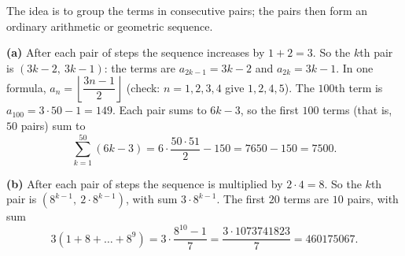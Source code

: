 The idea is to group the terms in consecutive pairs; the pairs then form an ordinary arithmetic or geometric sequence.

\textbf{(a)} After each pair of steps the sequence increases by $1+2=3$. So the $k$th pair is $(3k-2,\ 3k-1)$: the terms are $a_{2k-1}=3k-2$ and $a_{2k}=3k-1$. In one formula, $a_n=\left\lfloor\dfrac{3n-1}{2}\right\rfloor$ (check: $n=1,2,3,4$ give $1,2,4,5$). The $100$th term is $a_{100}=3\cdot50-1=\boxed{149}$. Each pair sums to $6k-3$, so the first $100$ terms (that is, $50$ pairs) sum to
\[
\sum_{k=1}^{50}(6k-3)=6\cdot\dfrac{50\cdot51}{2}-150=7650-150=\boxed{7500}.
\]

\textbf{(b)} After each pair of steps the sequence is multiplied by $2\cdot4=8$. So the $k$th pair is $(8^{k-1},\ 2\cdot8^{k-1})$, with sum $3\cdot8^{k-1}$. The first $20$ terms are $10$ pairs, with sum
\[
3\left(1+8+\dots+8^9\right)=3\cdot\dfrac{8^{10}-1}{7}=\dfrac{3\cdot1073741823}{7}=\boxed{460175067}.
\]
